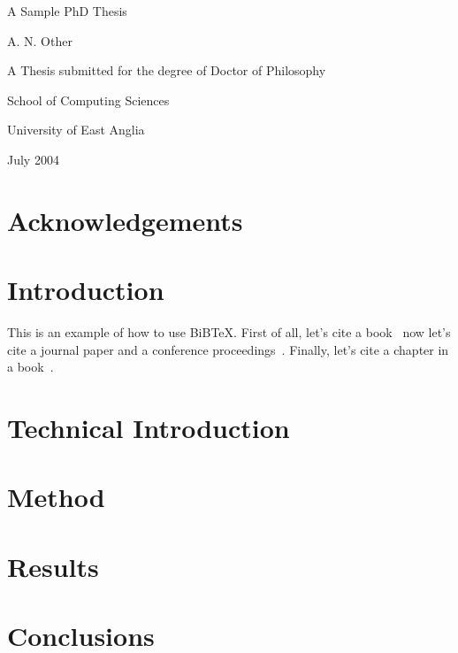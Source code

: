\documentclass[a4paper,12pt]{report}
\begin{document}

\begin{titlepage}
\begin{center}
\vspace*{1in}
{\LARGE A Sample PhD Thesis}
\par
\vspace{1.5in}
{\large A. N. Other}
\par
\vfill
A Thesis submitted for the degree of Doctor of Philosophy
\par
\vspace{0.5in}
School of Computing Sciences
\par
\vspace{0.5in}
University of East Anglia
\par
\vspace{0.5in}
July 2004
\end{center}
\end{titlepage}


\renewcommand{\baselinestretch}{1.66}

\tableofcontents
\listoffigures
\listoftables

\chapter*{Acknowledgements}

\begin{abstract}
\end{abstract}


\chapter{Introduction}
\label{ch:intro}

This is an example of how to use BiB\TeX.
First of all, let's cite a book~\cite{wainwright93}
now let's cite a journal paper and a conference proceedings~\cite{cawley96,talbot97}.
Finally, let's cite a chapter in a book~\cite[Chapter 9]{goossens97}.

\chapter{Technical Introduction}
\label{ch:techintro}

\chapter{Method}
\label{ch:method}

\chapter{Results}
\label{ch:results}

\chapter{Conclusions}
\label{ch:conc}



\end{document}

